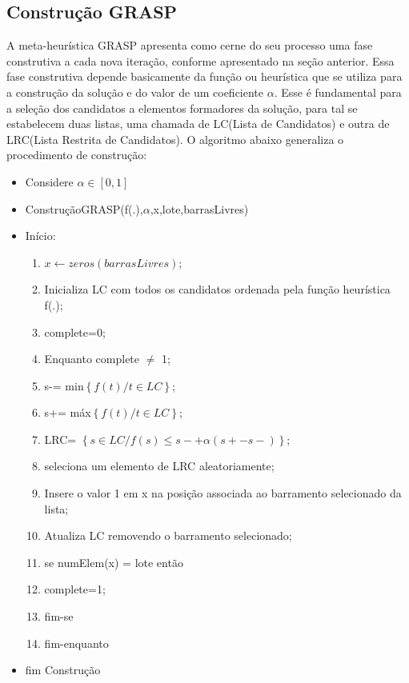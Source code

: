 \documentclass[12pt]{article}
\begin{document}
\subsection{Construção GRASP}

 A meta-heurística GRASP apresenta como cerne do seu processo uma fase construtiva a cada nova iteração, conforme apresentado na seção anterior. Essa fase construtiva depende basicamente da função ou heurística que se utiliza para a construção da solução e do valor de um coeficiente $\alpha$. Esse é fundamental para a seleção dos candidatos a elementos formadores da solução, para tal se estabelecem duas listas, uma chamada de LC(Lista de Candidatos) e outra de LRC(Lista Restrita de Candidatos). O algoritmo abaixo generaliza o procedimento de construção:
 
 \begin{itemize}
 	\item Considere $\alpha \in [0,1]$
 	\item ConstruçãoGRASP(f(.),$\alpha$,x,lote,barrasLivres)
 	\item Início:
 	\begin{enumerate}
 		\item $x \leftarrow zeros(barrasLivres)$; 
 		\item Inicializa LC com todos os candidatos ordenada pela função heurística f(.);
 		\item complete=0;
 		\item Enquanto complete $\neq$ 1;
 		\item \quad s-= min$\left \{f(t)/t \in LC \right \}$; 
 		\item \quad s+= máx$\left \{f(t)/t \in LC \right \}$; 
 		\item \quad LRC= $\left \{s \in LC/f(s) \leq s- +\alpha(s+ - s-) \right \}$;
 		\item \quad seleciona um elemento de LRC aleatoriamente;
 		\item \quad Insere o valor 1 em x na posição associada ao barramento selecionado da lista;
 		\item \quad Atualiza LC removendo o barramento selecionado;
 		\item \quad se numElem(x) = lote então
 		\item \qquad complete=1;
 		\item \quad fim-se
 		\item fim-enquanto
 	\end{enumerate}	
 	\item fim Construção
 \end{itemize}
\end{document}
